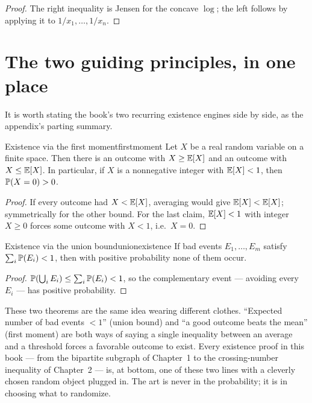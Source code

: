\begin{proof}
The right inequality is Jensen for the concave $\log$; the left follows by
applying it to $1/x_1,\dots,1/x_n$.
\end{proof}

\section{The two guiding principles, in one place}

It is worth stating the book's two recurring existence engines side by side, as
the appendix's parting summary.

\begin{theorem}{Existence via the first moment}{firstmoment}
Let $X$ be a real random variable on a finite space. Then there is an outcome
with $X\ge\mathbb{E}[X]$ and an outcome with $X\le\mathbb{E}[X]$. In particular, if $X$ is a
nonnegative integer with $\mathbb{E}[X]<1$, then $\mathbb{P}(X=0)>0$.
\end{theorem}

\begin{proof}
If every outcome had $X<\mathbb{E}[X]$, averaging would give $\mathbb{E}[X]<\mathbb{E}[X]$; symmetrically
for the other bound. For the last claim, $\mathbb{E}[X]<1$ with integer $X\ge0$ forces
some outcome with $X<1$, i.e.\ $X=0$.
\end{proof}

\begin{theorem}{Existence via the union bound}{unionexistence}
If bad events $E_1,\dots,E_m$ satisfy $\sum_i\mathbb{P}(E_i)<1$, then with positive
probability none of them occur.
\end{theorem}

\begin{proof}
$\mathbb{P}(\bigcup_i E_i)\le\sum_i\mathbb{P}(E_i)<1$, so the complementary event ---
avoiding every $E_i$ --- has positive probability.
\end{proof}

\begin{insight}
These two theorems are the same idea wearing different clothes. ``Expected
number of bad events $<1$'' (union bound) and ``a good outcome beats the mean''
(first moment) are both ways of saying a single inequality between an average
and a threshold forces a favorable outcome to exist. Every existence proof in
this book --- from the bipartite subgraph of Chapter~1 to the crossing-number
inequality of Chapter~2 --- is, at bottom, one of these two lines with a
cleverly chosen random object plugged in. The art is never in the probability;
it is in choosing what to randomize.
\end{insight}

